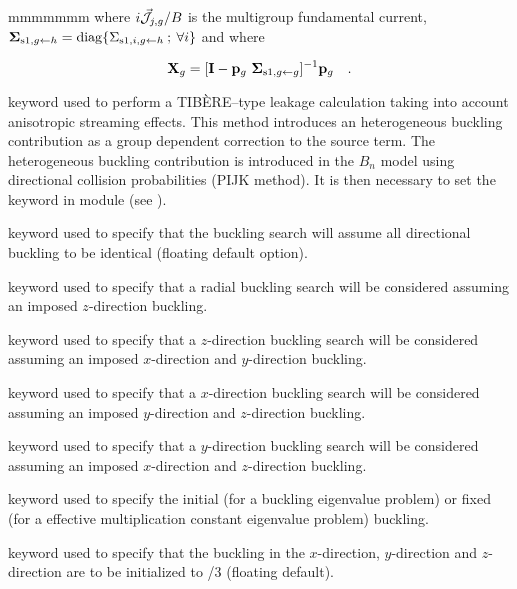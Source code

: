 \begin{ListeDeDescription}{mmmmmmm}
\noindent where $i\vec{\cal J}_{j,g}/B$ is the multigroup fundamental current, ${\bf \Sigma}_{{\rm s1},g \gets h}={\rm diag}\{ \Sigma_{{\rm s1},i,g \gets h}\> ;\> \forall i \}$ and where

\begin{equation}
{\bf X}_g=[{\bf I}-{\bf p}_g \ {\bf\Sigma}_{{\rm s}1,g\gets g}]^{-1} {\bf p}_g \ \ \ .
\label{eq:eq5.37ter}
\end{equation}

\item[\moc{HETE}] keyword used to perform a TIB\`ERE--type leakage
calculation taking into account anisotropic streaming effects. This method
introduces an heterogeneous buckling contribution as a group dependent correction
to the source term.\cite{PIJK0,PIJK} The heterogeneous buckling contribution is
introduced in the $B_n$ model using directional collision probabilities (PIJK method).
It is then necessary to set the keyword
 in module  (see ).

\item[\moc{G}] keyword used to specify that the buckling search will assume
all directional buckling to be identical (floating default option).

\item[\moc{R}] keyword used to specify that a radial buckling search will be
considered assuming an imposed $z$-direction buckling.

\item[\moc{Z}] keyword used to specify that a $z$-direction buckling search
will be considered  assuming an imposed $x$-direction and $y$-direction
buckling.

\item[\moc{X}] keyword used to specify that a $x$-direction buckling search
will be considered  assuming an imposed $y$-direction and $z$-direction
buckling.

\item[\moc{Y}] keyword used to specify that a $y$-direction buckling search
will be considered  assuming an imposed $x$-direction and $z$-direction
buckling.

\item[\moc{BUCK}] keyword used to specify the initial (for a buckling
eigenvalue problem) or fixed (for a effective multiplication constant eigenvalue
problem) buckling. 

\item[\moc{G}] keyword used to specify that the buckling in the $x$-direction,
$y$-direction and $z$-direction are to be initialized to /3
(floating default).


\end{ListeDeDescription}
